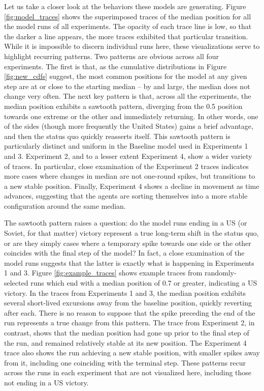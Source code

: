 Let us take a closer look at the behaviors these models are generating. Figure \ref{fig:model_traces} shows the superimposed traces of the median position for all the model runs of all experiments. The opacity of each trace line is low, so that the darker a line appears, the more traces exhibited that particular transition. While it is impossible to discern individual runs here, these visualizations serve to highlight recurring patterns. Two patterns are obvious across all four experiments. The first is that, as the cumulative distributions in Figure \ref{fig:new_cdfs} suggest, the most common positions for the model at any given step are at or close to the starting median -- by and large, the median does not change very often. The next key pattern is that, across all the experiments, the median position exhibits a sawtooth pattern, diverging from the 0.5 position towards one extreme or the other and immediately returning. In other words, one of the sides (though more frequently the United States) gains a brief advantage, and then the status quo quickly reasserts itself. This sawtooth pattern is particularly distinct and uniform in the Baseline model used in Experiments 1 and 3. Experiment 2, and to a lesser extent Experiment 4, show a wider variety of traces. In particular, close examination of the Experiment 2 traces indicates more cases where changes in median are not one-round spikes, but transitions to a new stable position. Finally, Experiment 4 shows a decline in movement as time advances, suggesting that the agents are sorting themselves into a more stable configuration around the same median.

The sawtooth pattern raises a question: do the model runs ending in a US (or Soviet, for that matter) victory represent a true long-term shift in the status quo, or are they simply cases where a temporary spike towards one side or the other coincides with the final step of the model? In fact, a close examination of the model runs suggests that the latter is exactly what is happening in Experiments 1 and 3. Figure \ref{fig:example_traces} shows example traces from randomly-selected runs which end with a median position of 0.7 or greater, indicating a US victory. In the traces from Experiments 1 and 3, the median position exhibits several short-lived excursions away from the baseline position, quickly reverting after each. There is no reason to suppose that the spike preceding the end of the run represents a true change from this pattern. The trace from Experiment 2, in contrast, shows that the median position had gone up prior to the final step of the run, and remained relatively stable at its new position. The Experiment 4 trace also shows the run achieving a new stable position, with smaller spikes away from it, including one coinciding with the terminal step. These patterns recur across the runs in each experiment that are not visualized here, including those not ending in a US victory.

